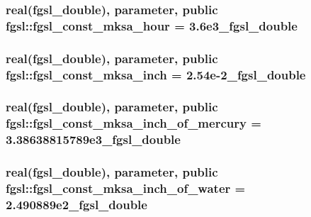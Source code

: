 \hypertarget{classfgsl_aa7d132341cda0d591f1452a894cf5855}{
\subsubsection[{fgsl\-\_\-const\-\_\-mksa\-\_\-hour}]{\setlength{\rightskip}{0pt plus 5cm}real({\bf fgsl\-\_\-double}), parameter, public fgsl\-::fgsl\-\_\-const\-\_\-mksa\-\_\-hour = 3.\-6e3\-\_\-fgsl\-\_\-double}}\label{classfgsl_aa7d132341cda0d591f1452a894cf5855}
\hypertarget{classfgsl_a272689a26b0b7b5cd89f28713aa251d4}{
\subsubsection[{fgsl\-\_\-const\-\_\-mksa\-\_\-inch}]{\setlength{\rightskip}{0pt plus 5cm}real({\bf fgsl\-\_\-double}), parameter, public fgsl\-::fgsl\-\_\-const\-\_\-mksa\-\_\-inch = 2.\-54e-\/2\-\_\-fgsl\-\_\-double}}\label{classfgsl_a272689a26b0b7b5cd89f28713aa251d4}
\hypertarget{classfgsl_a66f697c831591659ce7e9305e7c18c46}{
\subsubsection[{fgsl\-\_\-const\-\_\-mksa\-\_\-inch\-\_\-of\-\_\-mercury}]{\setlength{\rightskip}{0pt plus 5cm}real({\bf fgsl\-\_\-double}), parameter, public fgsl\-::fgsl\-\_\-const\-\_\-mksa\-\_\-inch\-\_\-of\-\_\-mercury = 3.\-38638815789e3\-\_\-fgsl\-\_\-double}}\label{classfgsl_a66f697c831591659ce7e9305e7c18c46}
\hypertarget{classfgsl_afdebd41de62af9d5a4b9ed6efcf9cea2}{
\subsubsection[{fgsl\-\_\-const\-\_\-mksa\-\_\-inch\-\_\-of\-\_\-water}]{\setlength{\rightskip}{0pt plus 5cm}real({\bf fgsl\-\_\-double}), parameter, public fgsl\-::fgsl\-\_\-const\-\_\-mksa\-\_\-inch\-\_\-of\-\_\-water = 2.\-490889e2\-\_\-fgsl\-\_\-double}}\label{classfgsl_afdebd41de62af9d5a4b9ed6efcf9cea2}
